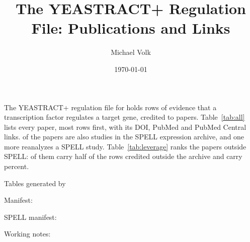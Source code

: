 \documentclass[10pt,a4paper]{article}
\title{\vspace{-1.5em}The YEASTRACT+ Regulation File: Publications and Links}
\author{Michael Volk}
\date{\today}
\begin{document}
\maketitle
\thispagestyle{empty}

\noindent
The YEASTRACT+ regulation file for  holds
\ytNRows{} rows of evidence that a transcription factor regulates a target
gene, credited to \ytNPapers{} papers. Table~\ref{tab:all} lists every paper,
most rows first, with its DOI, PubMed and PubMed Central links.
\ytNSpellPapers{} of the papers are also studies in the SPELL expression
archive, and one more reanalyzes a SPELL study. Table~\ref{tab:leverage} ranks
the papers outside SPELL: \ytNPapersToFifty{} of them carry half of the rows
credited outside the archive and \ytNLeveragePapers{} carry \ytLeveragePct{}
percent.

\vspace{0.5em}
{\small\color{tcgray}
Tables generated by \par
Manifest: \par
SPELL manifest: \par
Working notes: \par}

\vspace{1em}
\tccontents





\end{document}
